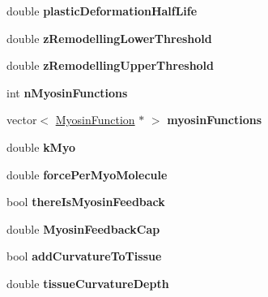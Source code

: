 \begin{DoxyCompactItemize}
\item 
\hypertarget{classSimulation_a1aeea82e56a6523f2918583af1ecdd1a}{}double {\bfseries plastic\+Deformation\+Half\+Life}\label{classSimulation_a1aeea82e56a6523f2918583af1ecdd1a}

\item 
\hypertarget{classSimulation_a28126585484ed0c7676c880cfe92f991}{}double {\bfseries z\+Remodelling\+Lower\+Threshold}\label{classSimulation_a28126585484ed0c7676c880cfe92f991}

\item 
\hypertarget{classSimulation_ab455f57038010e1d9c6694eb99ddca8e}{}double {\bfseries z\+Remodelling\+Upper\+Threshold}\label{classSimulation_ab455f57038010e1d9c6694eb99ddca8e}

\item 
\hypertarget{classSimulation_a99cf859f33b779f43f46e23df7227803}{}int {\bfseries n\+Myosin\+Functions}\label{classSimulation_a99cf859f33b779f43f46e23df7227803}

\item 
\hypertarget{classSimulation_aa662969fe152e645993a23834a4e6920}{}vector$<$ \hyperlink{classMyosinFunction}{Myosin\+Function} $\ast$ $>$ {\bfseries myosin\+Functions}\label{classSimulation_aa662969fe152e645993a23834a4e6920}

\item 
\hypertarget{classSimulation_a3f011f0be023bdb2dcf0e7535dc88789}{}double {\bfseries k\+Myo}\label{classSimulation_a3f011f0be023bdb2dcf0e7535dc88789}

\item 
\hypertarget{classSimulation_a7ed80530f06f7579e8bf3f4f24f685b6}{}double {\bfseries force\+Per\+Myo\+Molecule}\label{classSimulation_a7ed80530f06f7579e8bf3f4f24f685b6}

\item 
\hypertarget{classSimulation_a6a108c1bae9f479316ab41dd227107af}{}bool {\bfseries there\+Is\+Myosin\+Feedback}\label{classSimulation_a6a108c1bae9f479316ab41dd227107af}

\item 
\hypertarget{classSimulation_ae9d6b9bc095b2ebaa9ba194edd74582a}{}double {\bfseries Myosin\+Feedback\+Cap}\label{classSimulation_ae9d6b9bc095b2ebaa9ba194edd74582a}

\item 
\hypertarget{classSimulation_a11acf13f9f67a78b577e8350e75c0cad}{}bool {\bfseries add\+Curvature\+To\+Tissue}\label{classSimulation_a11acf13f9f67a78b577e8350e75c0cad}

\item 
\hypertarget{classSimulation_ac9fb8502871923725b5607487ce69108}{}double {\bfseries tissue\+Curvature\+Depth}\label{classSimulation_ac9fb8502871923725b5607487ce69108}


\end{DoxyCompactItemize}

